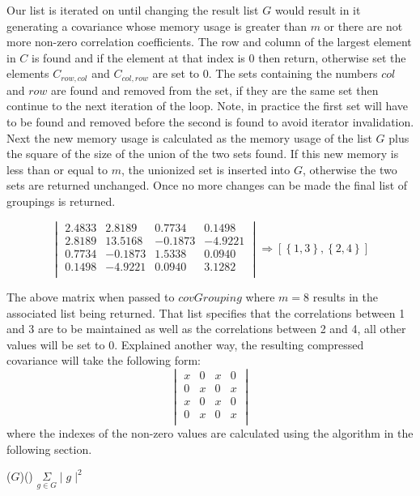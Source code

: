 \documentclass[11pt]{article}
\begin{document}
Our list is iterated on until changing the result list $G$ would result in it generating a covariance whose memory usage is greater than $m$ or there are not more non-zero correlation coefficients.
The row and column of the largest element in $C$ is found and if the element at that index is $0$ then return, otherwise set the elements $C_{row,col}$ and $C_{col,row}$ are set to $0$.  
The sets containing the numbers $col$ and $row$ are found and removed from the set, if they are the same set then continue to the next iteration of the loop. 
Note, in practice the first set will have to be found and removed before the second is found to avoid iterator invalidation. 
Next the new memory usage is calculated as the memory usage of the list $G$ plus the square of the size of the union of the two sets found. 
If this new memory is less than or equal to $m$, the unionized set is inserted into $G$, otherwise the two sets are returned unchanged. 
Once no more changes can be made the final list of groupings is returned. 

\begin{figure}[h]
$$
\begin{vmatrix}
	2.4833 & 2.8189  &  0.7734  &  0.1498 \\
    2.8189 & 13.5168 & -0.1873  & -4.9221 \\
    0.7734 & -0.1873 &  1.5338  &  0.0940 \\
    0.1498 & -4.9221 &  0.0940  &  3.1282 \\
\end{vmatrix}
\Rightarrow 
\left[\left\{1,3\right\},\left\{2,4\right\}\right]
$$
\end{figure}

The above matrix when passed to $covGrouping$ where $m = 8$ results in the associated list being returned. 
That list specifies that the correlations between 1 and 3 are to be maintained as well as the correlations between 2 and 4, all other values will be set to $0$. 
Explained another way, the resulting compressed covariance will take the following form:
$$
\begin{vmatrix}
	x & 0 & x & 0 \\
	0 & x & 0 & x \\
	x & 0 & x & 0 \\
	0 & x & 0 & x \\
\end{vmatrix}
$$
where the indexes of the non-zero values are calculated using the algorithm in the following section. 

\begin{algorithm}

\memoryUsage($G$)\Begin() {
	\Return $\underset{g \in G}{\Sigma}\mid g \mid^2$
}
	
\end{algorithm}
\end{document}
